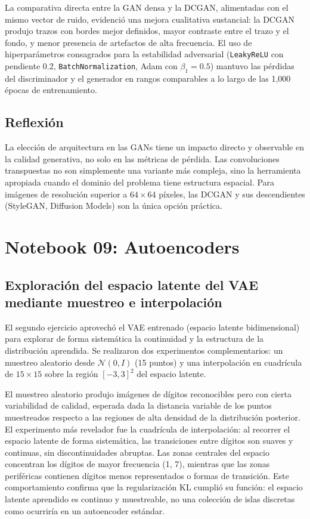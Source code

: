 \documentclass[12pt, a4paper]{article}
\begin{document}
La comparativa directa entre la GAN densa y la DCGAN, alimentadas con el mismo vector de ruido, evidenció una mejora cualitativa sustancial: la DCGAN produjo trazos con bordes mejor definidos, mayor contraste entre el trazo y el fondo, y menor presencia de artefactos de alta frecuencia. El uso de hiperparámetros consagrados para la estabilidad adversarial (\texttt{LeakyReLU} con pendiente 0.2, \texttt{BatchNormalization}, Adam con $\beta_1 = 0.5$) mantuvo las pérdidas del discriminador y el generador en rangos comparables a lo largo de las 1,000 épocas de entrenamiento.

\subsection{Reflexión}

La elección de arquitectura en las GANs tiene un impacto directo y observable en la calidad generativa, no solo en las métricas de pérdida. Las convoluciones transpuestas no son simplemente una variante más compleja, sino la herramienta apropiada cuando el dominio del problema tiene estructura espacial. Para imágenes de resolución superior a $64 \times 64$ píxeles, las DCGAN y sus descendientes (StyleGAN, Diffusion Models) son la única opción práctica.

\section{Notebook 09: Autoencoders}

\subsection{Exploración del espacio latente del VAE mediante muestreo e interpolación}

El segundo ejercicio aprovechó el VAE entrenado (espacio latente bidimensional) para explorar de forma sistemática la continuidad y la estructura de la distribución aprendida. Se realizaron dos experimentos complementarios: un muestreo aleatorio desde $\mathcal{N}(0, I)$ (15 puntos) y una interpolación en cuadrícula de $15 \times 15$ sobre la región $[-3, 3]^2$ del espacio latente.

El muestreo aleatorio produjo imágenes de dígitos reconocibles pero con cierta variabilidad de calidad, esperada dada la distancia variable de los puntos muestreados respecto a las regiones de alta densidad de la distribución posterior. El experimento más revelador fue la cuadrícula de interpolación: al recorrer el espacio latente de forma sistemática, las transiciones entre dígitos son suaves y continuas, sin discontinuidades abruptas. Las zonas centrales del espacio concentran los dígitos de mayor frecuencia (1, 7), mientras que las zonas periféricas contienen dígitos menos representados o formas de transición. Este comportamiento confirma que la regularización KL cumplió su función: el espacio latente aprendido es continuo y muestreable, no una colección de islas discretas como ocurriría en un autoencoder estándar.
\end{document}
